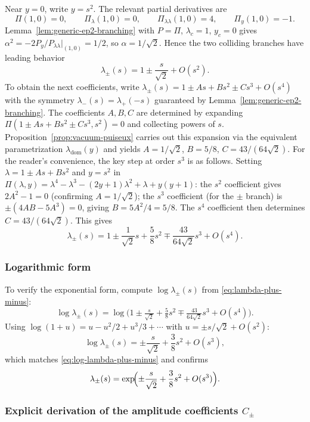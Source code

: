 Near $y=0$, write $y=s^2$.
The relevant partial derivatives are
\[
\Pi(1,0)=0,\qquad
\Pi_\lambda(1,0)=0,\qquad
\Pi_{\lambda\lambda}(1,0)=4,\qquad
\Pi_y(1,0)=-1.
\]
Lemma~\ref{lem:generic-ep2-branching} with $P=\Pi$, $\lambda_c=1$, $y_c=0$ gives $\alpha^2=-2P_y/P_{\lambda\lambda}\big|_{(1,0)}=1/2$, so $\alpha=1/\sqrt2$.
Hence the two colliding branches have leading behavior
\[
\lambda_\pm(s)=1\pm \frac{s}{\sqrt2}+O(s^2).
\]
To obtain the next coefficients, write $\lambda_\pm(s)=1\pm As+Bs^2\pm Cs^3+O(s^4)$ with the symmetry $\lambda_-(s)=\lambda_+(-s)$ guaranteed by Lemma~\ref{lem:generic-ep2-branching}.
The coefficients $A,B,C$ are determined by expanding $\Pi(1\pm As+Bs^2\pm Cs^3,s^2)=0$ and collecting powers of $s$.
Proposition~\ref{prop:vacuum-puiseux} carries out this expansion via the equivalent parametrization $\lambda_{\mathrm{dom}}(y)$ and yields $A=1/\sqrt2$, $B=5/8$, $C=43/(64\sqrt2)$.
For the reader's convenience, the key step at order $s^3$ is as follows.
Setting $\lambda=1\pm As+Bs^2$ and $y=s^2$ in $\Pi(\lambda,y)=\lambda^4-\lambda^3-(2y+1)\lambda^2+\lambda+y(y+1)$:
the $s^2$ coefficient gives $2A^2-1=0$ (confirming $A=1/\sqrt2$);
the $s^3$ coefficient (for the $\pm$ branch) is $\pm(4AB-5A^3)=0$, giving $B=5A^2/4=5/8$.
The $s^4$ coefficient then determines $C=43/(64\sqrt2)$.
This gives
\begin{equation}\label{eq:lambda-plus-minus}
\lambda_\pm(s)
=
1\pm \frac{1}{\sqrt2}s+\frac58 s^2 \mp \frac{43}{64\sqrt2}s^3+O(s^4).
\end{equation}

\subsubsection*{Logarithmic form}

To verify the exponential form, compute $\log\lambda_\pm(s)$ from \eqref{eq:lambda-plus-minus}:
\[
\log\lambda_\pm(s)
=\log\bigl(1\pm\tfrac{s}{\sqrt2}+\tfrac58s^2\mp\tfrac{43}{64\sqrt2}s^3+O(s^4)\bigr).
\]
Using $\log(1+u)=u-u^2/2+u^3/3+\cdots$ with $u=\pm s/\sqrt2+O(s^2)$:
\[
\log\lambda_\pm(s)=\pm\frac{s}{\sqrt2}+\frac38 s^2+O(s^3),
\]
which matches \eqref{eq:log-lambda-plus-minus} and confirms
\begin{equation}\label{eq:lambda-pm-exp}
\lambda_\pm(s)=\exp\!\Bigl(\pm\frac{s}{\sqrt2}+\frac38 s^2+O(s^3)\Bigr).
\end{equation}

\subsubsection*{Explicit derivation of the amplitude coefficients \texorpdfstring{$C_\pm$}{C\_pm}}


